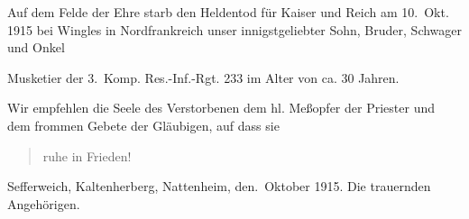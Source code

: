 

\pstart
Auf dem Felde der Ehre starb den Heldentod\ob
für Kaiser und Reich am 10.\ Okt. 1915 bei Wingles\ob
in Nordfrankreich unser innigstgeliebter Sohn,\ob
Bruder, Schwager und Onkel

\pend
{}
\pstart

Musketier der 3.\ Komp. Res.-Inf.-Rgt. 233\ob
im Alter von ca. 30 Jahren.

Wir empfehlen die Seele des Verstorbenen dem\ob
hl. Meßopfer der Priester und dem frommen Gebete\ob
der Gläubigen, auf dass sie

\pend
\begin{verse}
ruhe in Frieden!
\end{verse}
\pstart
Sefferweich, Kaltenherberg, Nattenheim, den.\ Oktober 1915.\ob
Die trauernden Angehörigen.
\pend
